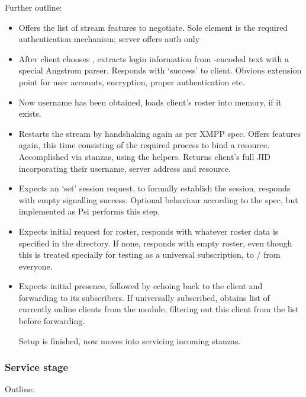 \documentclass[12pt,a4paper,twoside,openright]{report}
\begin{document}
{Further outline:

\begin{itemize}
  \item Offers the list of stream features to negotiate. Sole element is the required authentication mechanism; server offers  auth only

  \item After client chooses , extracts login information from -encoded text with a special Angstrom parser. Responds with `success' to client. Obvious extension point for user accounts, encryption, proper authentication etc.

  \item Now username has been obtained, loads client's roster into memory, if it exists.

  \item Restarts the stream by handshaking again as per XMPP spec. Offers features again, this time consisting of the required process to bind a resource. Accomplished via  stanzas, using the  helpers. Returns client's full JID incorporating their username, server address and resource.

  \item Expects an  `set' session request, to formally establish the session, responds with empty  signalling success. Optional behaviour according to the spec, but implemented as Psi performs this step.

  \item Expects initial request for roster, responds with whatever roster data is specified in the  directory. If none, responds with empty roster, even though this is treated specially for testing as a universal subscription, to / from everyone.

  \item Expects initial presence, followed by echoing back to the client and forwarding to its subscribers. If universally subscribed, obtains list of currently online clients from the  module, filtering out this client from the list before forwarding.

  Setup is finished, now moves into servicing incoming stanzas.
\end{itemize}

\subsubsection{Service stage}
Outline:

}
\end{document}
